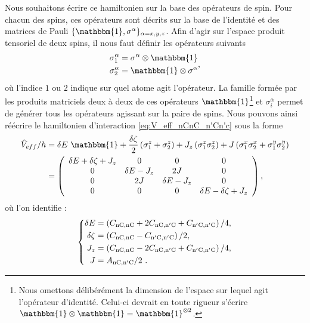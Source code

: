 Nous souhaitons écrire ce hamiltonien sur la base des opérateurs de spin.
Pour chacun des spins, ces opérateurs sont décrits sur la base de l'identité et des matrices de Pauli $\{\mathbbm{1},\sigma^\alpha \}_{\alpha=x,y,z}$.
Afin d'agir sur l'espace produit tensoriel de deux spins, il nous faut définir les opérateurs suivants
\begin{equation}
\label{eq:Pauli_tensor_space}
\begin{aligned}
\sigma_1^\alpha &= \sigma^\alpha \otimes \mathbbm{1} \\
\sigma_2^\alpha &= \mathbbm{1} \otimes \sigma^\alpha
\end{aligned},
\end{equation}
où l'indice $1$ ou $2$ indique sur quel atome agit l'opérateur.
La famille formée par les produits matriciels deux à deux de ces opérateurs $\mathbbm{1}$\footnote{
Nous omettons délibérément la dimension de l'espace sur lequel agit l'opérateur d'identité. Celui-ci devrait en toute rigueur s'écrire $\mathbbm{1}\otimes \mathbbm{1} = \mathbbm{1}^{\otimes 2}$.
} et $\sigma_i^\alpha$ permet de générer tous les opérateurs agissant sur la paire de spins.
Nous pouvons ainsi réécrire le hamiltonien d'interaction \eqref{eq:V_eff_nCnC_n'Cn'c} sous la forme
%
\begin{equation}
\label{eq:Veff_2at_Pauli}
\begin{aligned}
\hat{V}_{eff}/h &= \delta E~\mathbbm{1}
+ \frac{\delta\zeta}{2}\left( \sigma_1^z + \sigma_2^z \right)
+ J_z\left( \sigma_1^z \sigma_2^z \right)
+ J \left( \sigma_1^x \sigma_2^x + \sigma_1^y \sigma_2^y \right) \\
&= \left( \begin{array}{cccc}
\delta E + \delta \zeta + J_z & 0 & 0 & 0 \\
0 & \delta E - J_z & 2J & 0 \\
0 & 2J & \delta E - J_z & 0 \\
0 & 0 & 0 & \delta E - \delta \zeta + J_z \\
\end{array} \right),
\end{aligned}
\end{equation}
%
où l'on identifie :
%
\begin{equation}
\label{eq:ident_XXZ}
\left\{
\begin{aligned}
\delta E &= \left( C_{\mathrm{nC},\mathrm{nC}} + 2C_{\mathrm{nC},\mathrm{n'C}} + C_{\mathrm{n'C},\mathrm{n'C}} \right)/4, \\
\delta \zeta &= \left( C_{\mathrm{nC},\mathrm{nC}} - C_{\mathrm{n'C},\mathrm{n'C}} \right)/2, \\
J_z &= \left( C_{\mathrm{nC},\mathrm{nC}} - 2C_{\mathrm{nC},\mathrm{n'C}} + C_{\mathrm{n'C},\mathrm{n'C}} \right)/4, \\
J &= A_{\mathrm{nC},\mathrm{n'C}} /2~.
\end{aligned} \right.
\end{equation}

